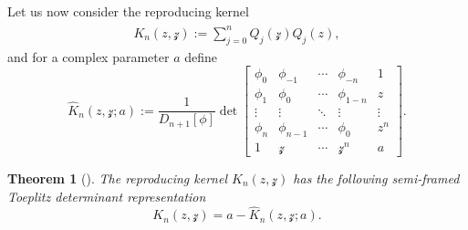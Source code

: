 \documentclass[pdftex]{sigma}
\numberwithin{equation}{section}
\newtheorem{Theorem}{Theorem}[section]
\begin{document}
Let us now consider the reproducing kernel
		\begin{gather*}%
			K_{n}(z,\mathcal{z}) := \sum_{j=0}^{n} Q_{j}(\mathcal{z})\widehat{Q}_{j}(z),
		\end{gather*}
		and for a complex parameter $a$ define
		\begin{equation}\label{ReproducingKer}
			\widehat{K}_{n}(z,\mathcal{z};a) := \frac{1}{D_{n+1}[\phi]}\det
			\begin{bmatrix}
				\phi_{0} & \phi_{-1} & \cdots & \phi_{-n} & 1\\
				\phi_{1} & \phi_{0} & \cdots & \phi_{1-n} & z\\
				\vdots & \vdots & \ddots & \vdots & \vdots\\
				\phi_{n} & \phi_{n-1} & \cdots & \phi_{0} & z^{n} \\
				1 & \mathcal{z} & \cdots & \mathcal{z}^{n} & a
			\end{bmatrix}.
		\end{equation}
		\begin{Theorem}[\cite{GW}]\label{Rep Ker Semi Framed}
			The reproducing kernel $K_{n}(z,\mathcal{z})$ has the following semi-framed Toeplitz determinant representation 		\begin{equation}\label{repKer to semi-framed}
				K_{n}(z,\mathcal{z}) = a - \widehat{K}_{n}(z,\mathcal{z};a).
			\end{equation}
			
		\end{Theorem}
\end{document}
